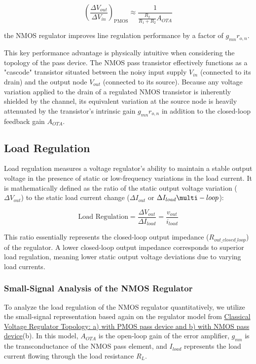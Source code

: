 \documentclass[
]{article}
\begin{document}
\[\left(\frac{\Delta V_{out}}{\Delta V_{in}}\right)_{\text{PMOS}} \approx \frac{1}{\frac{R_2}{R_1 + R_2} A_{OTA}}\]

the NMOS regulator improves line regulation performance by a factor of
\(g_{mn} r_{o,n}\).

This key performance advantage is physically intuitive when considering
the topology of the pass device. The NMOS pass transistor effectively
functions as a "cascode" transistor situated between the noisy input
supply \(V_{in}\) (connected to its drain) and the output node
\(V_{out}\) (connected to its source). Because any voltage variation
applied to the drain of a regulated NMOS transistor is inherently
shielded by the channel, its equivalent variation at the source node is
heavily attenuated by the transistor's intrinsic gain \(g_{mn} r_{o,n}\)
in addition to the closed-loop feedback gain \(A_{OTA}\).

\subsection{Load Regulation}\label{_load_regulation}

Load regulation measures a voltage regulator's ability to maintain a
stable output voltage in the presence of static or low-frequency
variations in the load current. It is mathematically defined as the
ratio of the static output voltage variation (\(\Delta V_{out}\)) to the
static load current change (\(\Delta I_{out}\) or \(\Delta I_{load}\multi-loop\)):

\[\text{Load Regulation} = \frac{\Delta V_{out}}{\Delta I_{load}} = \frac{v_{out}}{i_{load}}\]

This ratio essentially represents the closed-loop output impedance
(\(R_{out\_closed\_loop}\)) of the regulator. A lower closed-loop output
impedance corresponds to superior load regulation, meaning lower static
output voltage deviations due to varying load currents.

\subsubsection{Small-Signal Analysis of the NMOS
Regulator}\label{_small_signal_analysis_of_the_nmos_regulator}

To analyze the load regulation of the NMOS regulator quantitatively, we
utilize the small-signal representation based again on the regulator
model from
\hyperref[classical_voltage_reg_topologies_nmos_and_pmos_pass_devices]{Classical
Voltage Regulator Topology: a) with PMOS pass device and b) with NMOS
pass device}(b). In this model, \(A_{OTA}\) is the open-loop gain of the
error amplifier, \(g_{mn}\) is the transconductance of the NMOS pass
element, and \(I_{load}\) represents the load current flowing through
the load resistance \(R_L\).
\end{document}
